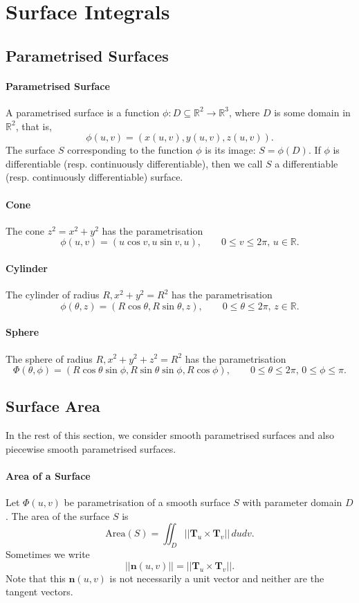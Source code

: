 \section{Surface Integrals}
\subsection{Parametrised Surfaces}
\paragraph{Parametrised Surface}
A parametrised surface is a function \(\phi: D \subseteq \mathbb R^2 \to \mathbb R^3\), where \(D\) is some domain in \(\mathbb R^2\), that is,
\[\phi (u,v) = (x(u,v), y(u,v), z(u,v)).\]
The surface \(S\) corresponding to the function \(\phi\) is its image: \(S = \phi(D)\). If \(\phi\) is differentiable (resp. continuously differentiable), then we call \(S\) a differentiable (resp. continuously differentiable) surface.

\paragraph{Cone}
The cone \(z^2 = x^2 + y^2\) has the parametrisation 
\[\phi(u,v) = (u\cos v, u\sin v, u), \qquad 0 \leq v \leq 2\pi, \, u \in \mathbb R.\]

\paragraph{Cylinder}
The cylinder of radius \(R, x^2 + y^2 = R^2\) has the parametrisation
\[\phi(\theta, z) = (R\cos\theta, R\sin\theta, z), \qquad 0\leq\theta\leq 2\pi, \, z\in\mathbb R.\]

\paragraph{Sphere}
The sphere of radius \(R, x^2 + y^2 + z^2 = R^2\) has the parametrisation
\[\Phi(\theta,\phi) = (R\cos\theta\sin\phi, R\sin\theta\sin\phi, R\cos\phi), \qquad 0 \leq \theta \leq 2\pi, \, 0 \leq \phi \leq \pi.\]

\subsection{Surface Area}
In the rest of this section, we consider smooth parametrised surfaces and also piecewise smooth parametrised surfaces.

\paragraph{Area of a Surface}
Let \(\Phi(u,v)\) be parametrisation of a smooth surface \(S\) with parameter domain \(D\). The area of the surface \(S\) is
\[\text{Area}(S) = \iint_D ||\textbf{T}_u \times \textbf{T}_v|| \, dudv.\]
Sometimes we write
\[||\textbf{n}(u,v)|| = ||\textbf{T}_u \times \textbf{T}_v||.\]
Note that this \(\textbf{n}(u,v)\) is not necessarily a unit vector and neither are the tangent vectors.

